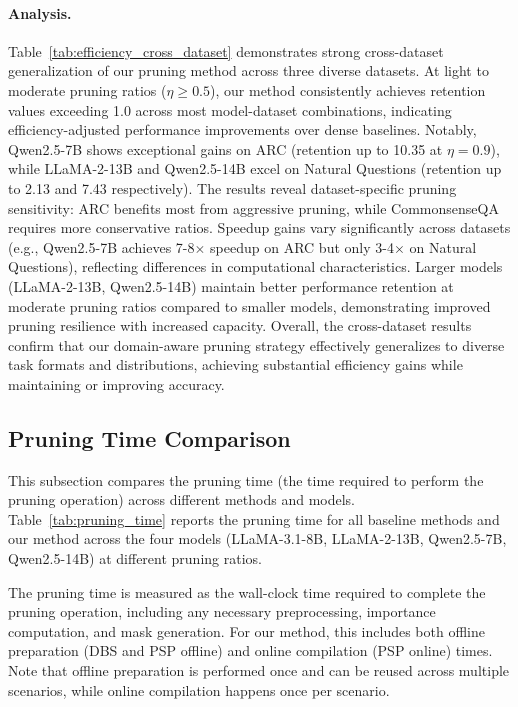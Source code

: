 \paragraph{Analysis.}
Table~\ref{tab:efficiency_cross_dataset} demonstrates strong cross-dataset generalization of our pruning method across three diverse datasets. At light to moderate pruning ratios ($\eta \geq 0.5$), our method consistently achieves retention values exceeding 1.0 across most model-dataset combinations, indicating efficiency-adjusted performance improvements over dense baselines. Notably, Qwen2.5-7B shows exceptional gains on ARC (retention up to 10.35 at $\eta=0.9$), while LLaMA-2-13B and Qwen2.5-14B excel on Natural Questions (retention up to 2.13 and 7.43 respectively). The results reveal dataset-specific pruning sensitivity: ARC benefits most from aggressive pruning, while CommonsenseQA requires more conservative ratios. Speedup gains vary significantly across datasets (e.g., Qwen2.5-7B achieves 7-8$\times$ speedup on ARC but only 3-4$\times$ on Natural Questions), reflecting differences in computational characteristics. Larger models (LLaMA-2-13B, Qwen2.5-14B) maintain better performance retention at moderate pruning ratios compared to smaller models, demonstrating improved pruning resilience with increased capacity. Overall, the cross-dataset results confirm that our domain-aware pruning strategy effectively generalizes to diverse task formats and distributions, achieving substantial efficiency gains while maintaining or improving accuracy.

\subsection{Pruning Time Comparison}
\label{app:pruning_time}

This subsection compares the pruning time (the time required to perform the pruning operation) across different methods and models.
Table~\ref{tab:pruning_time} reports the pruning time for all baseline methods and our method across the four models (LLaMA-3.1-8B, LLaMA-2-13B, Qwen2.5-7B, Qwen2.5-14B) at different pruning ratios.

The pruning time is measured as the wall-clock time required to complete the pruning operation, including any necessary preprocessing, importance computation, and mask generation.
For our method, this includes both offline preparation (DBS and PSP offline) and online compilation (PSP online) times.
Note that offline preparation is performed once and can be reused across multiple scenarios, while online compilation happens once per scenario.

